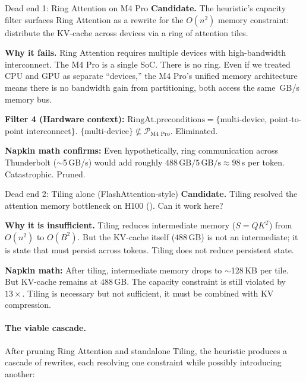 \documentclass[10pt,twocolumn]{article}
\newcommand{\cvalint}[1]{\pgfmathprintnumber[fixed, precision=0, 1000 sep={\,}]{#1}}
\newcommand{\EdgeKVTotalGB}{488}  %
\begin{document}
\begin{errorcase}{Dead end 1: Ring Attention on M4 Pro}
\textbf{Candidate.} The heuristic's capacity filter surfaces Ring Attention \citep{liu2023ring} as a rewrite for the $O(n^2)$ memory constraint: distribute the KV-cache across devices via a ring of attention tiles.

\textbf{Why it fails.} Ring Attention requires multiple devices with high-bandwidth interconnect. The M4 Pro is a single SoC. There is no ring. Even if we treated CPU and GPU as separate ``devices,'' the M4 Pro's unified memory architecture means there is no bandwidth gain from partitioning, both access the same \cvalint{\EdgeBWGBs}\,GB/s memory bus.

\textbf{Filter 4 (Hardware context):} $\text{RingAt}.\text{preconditions} = \{$multi-device, point-to-point interconnect$\}$. $\{$multi-device$\} \not\subseteq \mathcal{P}_{\text{M4 Pro}}$. Eliminated.

\textbf{Napkin math confirms:} Even hypothetically, ring communication across Thunderbolt ($\sim$5\,GB/s) would add roughly $\EdgeKVTotalGB{}\,\text{GB} / 5\,\text{GB/s} \approx 98$\,s per token. Catastrophic. Pruned.
\end{errorcase}

\begin{errorcase}{Dead end 2: Tiling alone (FlashAttention-style)}
\textbf{Candidate.} Tiling resolved the attention memory bottleneck on H100 (). Can it work here?

\textbf{Why it is insufficient.} Tiling reduces intermediate memory ($S = QK^T$) from $O(n^2)$ to $O(B^2)$. But the KV-cache itself ($\EdgeKVTotalGB$\,GB) is not an intermediate; it is state that must persist across tokens. Tiling does not reduce persistent state.

\textbf{Napkin math:} After tiling, intermediate memory drops to $\sim$128\,KB per tile. But KV-cache remains at $\EdgeKVTotalGB$\,GB. The capacity constraint is still violated by $13\times$. Tiling is necessary but not sufficient, it must be combined with KV compression.
\end{errorcase}

\paragraph{The viable cascade.} After pruning Ring Attention and standalone Tiling, the heuristic produces a cascade of rewrites, each resolving one constraint while possibly introducing another:
\end{document}
